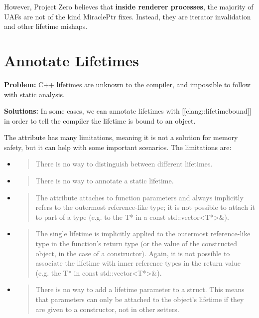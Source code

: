 \documentclass[a4paper,12pt,notitlepage,twoside,openright]{article}
\begin{document}
However, Project Zero believes that \textbf{inside renderer processes},
the majority of UAFs are not of the kind MiraclePtr fixes. Instead, they
are iterator invalidation and other lifetime mishaps.

\section{Annotate Lifetimes}

\textbf{Problem:} C++ lifetimes are unknown to the compiler, and
impossible to follow with static analysis.

\textbf{Solutions:} In some cases, we can annotate lifetimes
with {[}{[}clang::lifetimebound{]}{]} in order to tell the compiler the
lifetime is bound to an object.

The attribute has many limitations, meaning it is not a solution for
memory safety, but it can help with some important scenarios. The
limitations are:

\begin{itemize}
\item
  \begin{quote}
  There is no way to distinguish between different lifetimes.
  \end{quote}
\item
  \begin{quote}
  There is no way to annotate a static lifetime.
  \end{quote}
\item
  \begin{quote}
  The attribute attaches to function parameters and always implicitly
  refers to the outermost reference-like type; it is not possible to
  attach it to part of a type (e.g. to the T* in a const
  std::vector\textless T*\textgreater\&).
  \end{quote}
\item
  \begin{quote}
  The single lifetime is implicitly applied to the outermost
  reference-like type in the function's return type (or the value of the
  constructed object, in the case of a constructor). Again, it is not
  possible to associate the lifetime with inner reference types in the
  return value (e.g. the T* in const
  std::vector\textless T*\textgreater\&).
  \end{quote}
\item
  \begin{quote}
  There is no way to add a lifetime parameter to a struct. This means
  that parameters can only be attached to the object's lifetime if they
  are given to a constructor, not in other setters.
  \end{quote}
\end{itemize}
\end{document}
